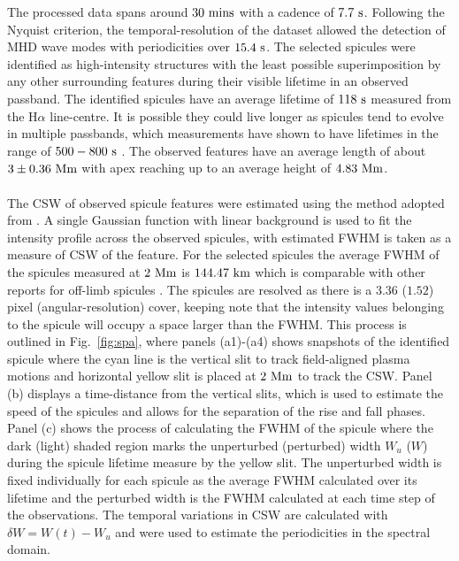 \documentclass[12pt]{ociamthesis}
\newcommand{\np}{\\ \\}
\begin{document}
The processed data spans around $30~\rm{mins}$ with a cadence of $7.7~\rm{s}$. Following the Nyquist criterion, the temporal-resolution of the dataset allowed the detection of MHD wave modes with periodicities over $15.4~\rm{s}$. The selected spicules were identified as high-intensity structures with the least possible superimposition by any other surrounding features during their visible lifetime in an observed passband. The identified spicules have an average lifetime of $118~\rm{s}$ measured from the H$\alpha$ line-centre. It is possible they could live longer as spicules tend to evolve in multiple passbands, which measurements have shown to have lifetimes in the range of $500-800~\rm{s}$ \citep{Pereira2014}. The observed features have an average length of about $3\pm0.36~\rm{Mm}$ with apex reaching up to an average height of $4.83~\rm{Mm}$. \np
%
The CSW of observed spicule features were estimated using the method adopted from \citet{Sharma2018}. A single Gaussian function with linear background is used to fit the intensity profile across the observed spicules, with estimated FWHM is taken as a measure of CSW of the feature. For the selected spicules the average FWHM of the spicules measured at $2~\rm{Mm}$ is $144.47~\rm{km}$ which is comparable with other reports for off-limb spicules \citep{Sharma2018}. The spicules are resolved as there is a $3.36$ ($1.52$) pixel (angular-resolution) cover, keeping note that the intensity values belonging to the spicule will occupy a space larger than the FWHM. This process is outlined in Fig.~\ref{fig:spa}, where panels (a1)-(a4) shows snapshots of the identified spicule where the cyan line is the vertical slit to track field-aligned plasma motions and horizontal yellow slit is placed at $2~\rm{Mm}$ to track the CSW. Panel (b) displays a time-distance from the vertical slits, which is used to estimate the speed of the spicules and allows for the separation of the rise and fall phases. Panel (c) shows the process of calculating the FWHM of the spicule where the dark (light) shaded region marks the unperturbed (perturbed) width $W_u$ ($W$) during the spicule lifetime measure by the yellow slit. The unperturbed width is fixed individually for each spicule as the average FWHM calculated over its lifetime and the perturbed width is the FWHM calculated at each time step of the observations. The temporal variations in CSW are calculated with $\delta W = W(t) - W_{u}$ and were used to estimate the periodicities in the spectral domain. \np
%
\end{document}
